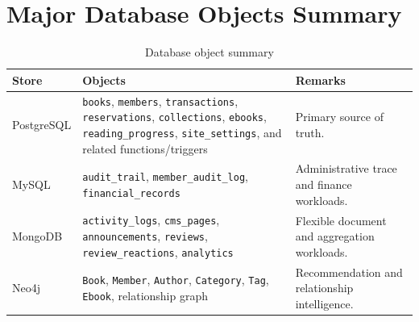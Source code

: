\documentclass[12pt,a4paper]{report}
\begin{document}
\chapter{Major Database Objects Summary}
\begin{table}[h!]
\centering
\begin{tabularx}{\textwidth}{p{} p{} X}
\toprule
\textbf{Store} & \textbf{Objects} & \textbf{Remarks} \\
\midrule
PostgreSQL & \texttt{books}, \texttt{members}, \texttt{transactions}, \texttt{reservations}, \texttt{collections}, \texttt{ebooks}, \texttt{reading\_progress}, \texttt{site\_settings}, and related functions/triggers & Primary source of truth. \\
MySQL & \texttt{audit\_trail}, \texttt{member\_audit\_log}, \texttt{financial\_records} & Administrative trace and finance workloads. \\
MongoDB & \texttt{activity\_logs}, \texttt{cms\_pages}, \texttt{announcements}, \texttt{reviews}, \texttt{review\_reactions}, \texttt{analytics} & Flexible document and aggregation workloads. \\
Neo4j & \texttt{Book}, \texttt{Member}, \texttt{Author}, \texttt{Category}, \texttt{Tag}, \texttt{Ebook}, relationship graph & Recommendation and relationship intelligence. \\
\bottomrule
\end{tabularx}
\caption{Database object summary}
\end{table}
\end{document}
